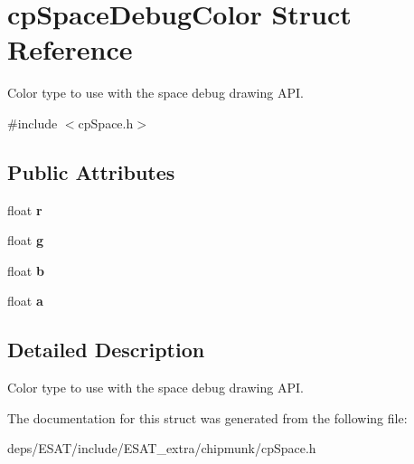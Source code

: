 \hypertarget{structcp_space_debug_color}{}\section{cp\+Space\+Debug\+Color Struct Reference}
\label{structcp_space_debug_color}


Color type to use with the space debug drawing A\+PI.  




{\ttfamily \#include $<$cp\+Space.\+h$>$}

\subsection*{Public Attributes}
\begin{DoxyCompactItemize}
\item 
\mbox{\label{structcp_space_debug_color_a8363abb3839ece1a2ea672e15054c31d}} 
float {\bfseries r}
\item 
\mbox{\label{structcp_space_debug_color_a842d9ced4b2d71df6de850c5c6580ef0}} 
float {\bfseries g}
\item 
\mbox{\label{structcp_space_debug_color_a4580b42ba3db2e7d945c224920ab8526}} 
float {\bfseries b}
\item 
\mbox{\label{structcp_space_debug_color_a9abbf5d9f4e3df34653ab5fc438e3b62}} 
float {\bfseries a}
\end{DoxyCompactItemize}


\subsection{Detailed Description}
Color type to use with the space debug drawing A\+PI. 

The documentation for this struct was generated from the following file\+:\begin{DoxyCompactItemize}
\item 
deps/\+E\+S\+A\+T/include/\+E\+S\+A\+T\+\_\+extra/chipmunk/cp\+Space.\+h\end{DoxyCompactItemize}
